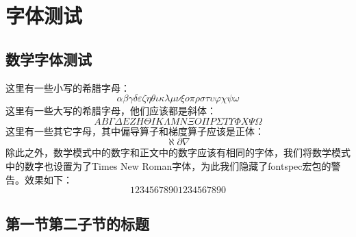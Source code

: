 
\section{字体测试}

\zhlipsum[1]

\subsection{数学字体测试}

这里有一些小写的希腊字母：
\begin{equation}
  \alpha \beta \gamma \delta \varepsilon \zeta \eta \theta \iota \kappa \lambda \mu \nu \xi o \pi \rho \sigma \tau \upsilon \varphi \chi \psi \omega
\end{equation}
这里有一些大写的希腊字母，他们应该都是斜体：
\begin{equation}
  A B \Gamma \Delta E Z H \Theta I K \Lambda M N \Xi O \Pi P \Sigma T \Upsilon \varPhi X \Psi \Omega
\end{equation}
这里有一些其它字母，其中偏导算子和梯度算子应该是正体：
\begin{equation}
  \aleph \partial \nabla
\end{equation}
除此之外，数学模式中的数字和正文中的数字应该有相同的字体，我们将数学模式中的数字也设置为了Times New Roman字体，为此我们隐藏了fontspec宏包的警告。效果如下：
\begin{equation}
  1234567890\text{1234567890}
\end{equation}

\zhlipsum[1]

\subsection{第一节第二子节的标题}

\zhlipsum
